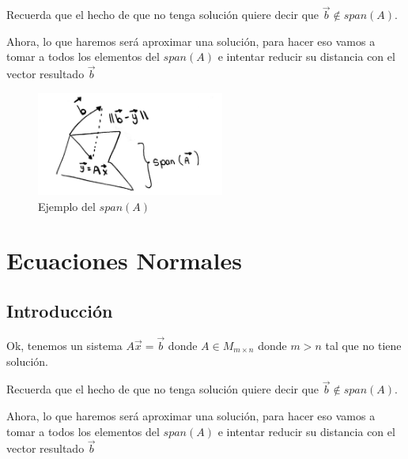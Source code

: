 \documentclass[12pt, fleqn]{report}                             %
\theoremstyle{break}                                            %
\begin{document}
            Recuerda que el hecho de que no tenga solución quiere decir que $\vec b \notin span(A)$.

            Ahora, lo que haremos será aproximar una solución, para hacer eso vamos a tomar a todos
            los elementos del $span(A)$ e intentar reducir su distancia con el vector resultado $\vec b$

            \begin{figure}[h]
                \includegraphics[width=0.55\textwidth]{FindSpanB}
                \caption{Ejemplo del $span(A)$}
            \end{figure}

    \chapter{Ecuaciones Normales}

        \clearpage
        \section{Introducción}

            Ok, tenemos un sistema $A \vec x = \vec b$ donde $A \in M_{m \times n}$ donde $m > n$
            tal que no tiene solución.

            Recuerda que el hecho de que no tenga solución quiere decir que $\vec b \notin span(A)$.

            Ahora, lo que haremos será aproximar una solución, para hacer eso vamos a tomar a todos
            los elementos del $span(A)$ e intentar reducir su distancia con el vector resultado $\vec b$


            \vspace{1em}
\end{document}
